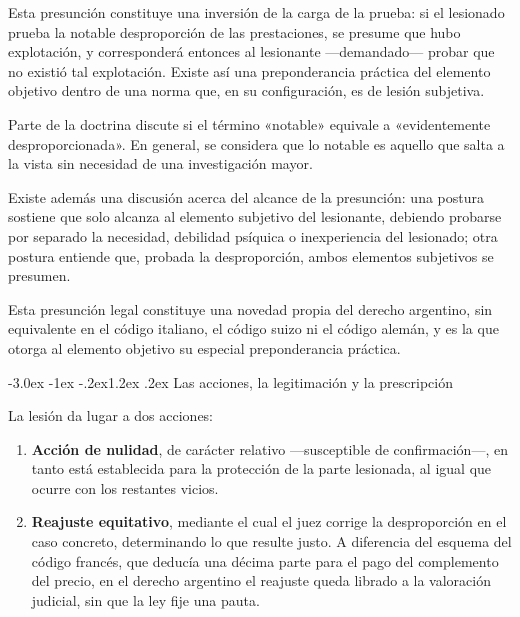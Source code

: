 \documentclass[12pt,oneside]{book}
\makeatletter
\renewcommand\section{\@startsection{section}{1}{\z@}%
  {-3.0ex \@plus -1ex \@minus -.2ex}{1.2ex \@plus .2ex}%
  {\normalfont\large\bfseries\color{acento}}}
\makeatother
\begin{document}
\begin{importante}
Esta presunción constituye una inversión de la carga de la prueba: si el lesionado prueba la notable desproporción de las prestaciones, se presume que hubo explotación, y corresponderá entonces al lesionante ---demandado--- probar que no existió tal explotación. Existe así una preponderancia práctica del elemento objetivo dentro de una norma que, en su configuración, es de lesión subjetiva.
\end{importante}

Parte de la doctrina discute si el término «notable» equivale a «evidentemente desproporcionada». En general, se considera que lo notable es aquello que salta a la vista sin necesidad de una investigación mayor.

Existe además una discusión acerca del alcance de la presunción: una postura sostiene que solo alcanza al elemento subjetivo del lesionante, debiendo probarse por separado la necesidad, debilidad psíquica o inexperiencia del lesionado; otra postura entiende que, probada la desproporción, ambos elementos subjetivos se presumen.

\begin{nota}
Esta presunción legal constituye una novedad propia del derecho argentino, sin equivalente en el código italiano, el código suizo ni el código alemán, y es la que otorga al elemento objetivo su especial preponderancia práctica.
\end{nota}

\section{Las acciones, la legitimación y la prescripción}

La lesión da lugar a dos acciones:

\begin{enumerate}
    \item \textbf{Acción de nulidad}, de carácter relativo ---susceptible de confirmación---, en tanto está establecida para la protección de la parte lesionada, al igual que ocurre con los restantes vicios.
    \item \textbf{Reajuste equitativo}, mediante el cual el juez corrige la desproporción en el caso concreto, determinando lo que resulte justo. A diferencia del esquema del código francés, que deducía una décima parte para el pago del complemento del precio, en el derecho argentino el reajuste queda librado a la valoración judicial, sin que la ley fije una pauta.
\end{enumerate}
\end{document}
